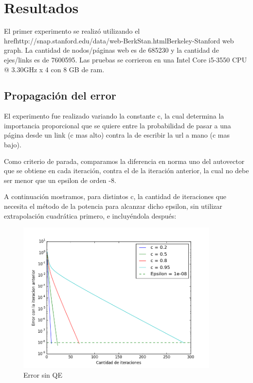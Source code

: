 \section{Resultados}

El primer experimento se realiz\'o utilizando el \\href{http://snap.stanford.edu/data/web-BerkStan.html}{Berkeley-Stanford web graph}. La cantidad de nodos/p\'aginas web es de 685230 y la cantidad de ejes/links es de 7600595.
Las pruebas se corrieron en una Intel Core i5-3550 CPU @ 3.30GHz x 4 con 8 GB de ram. 

\subsection{Propagaci\'on del error}

El experimento fue realizado variando la constante c, la cual determina la importancia proporcional que se quiere
entre la probabilidad de pasar a una p\'agina desde un link (c mas alto) contra la de escribir la url a mano (c mas bajo).

Como criterio de parada, comparamos la diferencia en norma uno del autovector que se obtiene
en cada iteraci\'on, contra el de la iteraci\'on anterior, la cual no debe ser menor que un
epsilon de orden -8.

A continuación mostramos, para distintos c, la cantidad de iteraciones que necesita el método de la potencia para alcanzar dicho epsilon, sin utilizar extrapolaci\'on cuadr\'atica primero, e incluy\'endola despu\'es:

\begin{figure}[H]
  \centering
    \includegraphics[width=0.9\textwidth]{errorSinQE.png}
    \caption{Error sin QE}
    \label{}
\end{figure}

